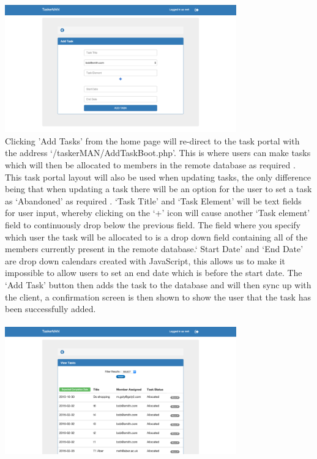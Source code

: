 \documentclass{project}
\begin{document}
\newline
\includegraphics[width=0.75\textwidth, center]{images/5.2/TaskerMANAddTask} \\
Clicking 'Add Tasks' from the home page will re-direct to the task portal with the address `/taskerMAN/AddTaskBoot.php'. This is where users can make tasks which will then be allocated to members in the remote database as required \cite{se.qa.rs}. This task portal layout will also be used when updating tasks, the only difference being that when updating a task there will be an option for the user to set a task as `Abandoned' as required \cite{se.qa.rs}. `Task Title' and `Task Element' will be text fields for user input, whereby clicking on the `+' icon will cause another `Task element' field to continuously drop below the previous field. The field where you specify which user the task will be allocated to is a drop down field containing all of the members currently present in the remote database.` Start Date' and `End Date' are drop down calendars created with JavaScript, this allows us to make it impossible to allow users to set an end date which is before the start date. The `Add Task' button then adds the task to the database and will then sync up with the client, a confirmation screen is then shown to show the user that the task has been successfully added. \\~\\
\newline
\includegraphics[width=0.75\textwidth, center]{images/5.2/TaskerMANViewTask} \\
\end{document}
